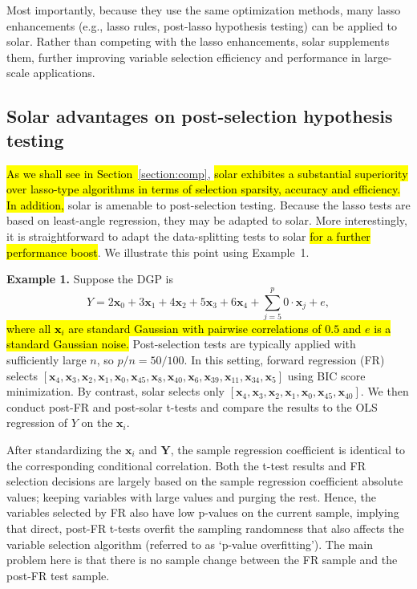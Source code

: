 \documentclass[11pt,review,authoryear]{elsarticle}
\begin{document}
Most importantly, because they use the same optimization methods, many lasso enhancements (e.g., lasso rules, post-lasso hypothesis testing) can be applied to solar. Rather than competing with the lasso enhancements, solar supplements them, further improving variable selection efficiency and performance in large-scale applications.

\subsection{Solar advantages on post-selection hypothesis testing}

\hl{As we shall see in Section~}\ref{section:comp}, \hl{solar exhibites a substantial superiority over lasso-type algorithms in terms of selection sparsity, accuracy and efficiency. In addition,} solar is amenable to post-selection testing. Because the lasso tests \citep{lockhartall14, taylor2014exact} are based on least-angle regression, they may be adapted to solar. More interestingly, it is straightforward to adapt the data-splitting tests \citep{wasserman2009high,meinshausen2009p} to solar \hl{for a further performance boost}. We illustrate this point using Example~1.

\smallskip
\noindent
\textbf{Example 1.} Suppose the DGP is
%
\begin{equation}
  Y = 2 \mathbf{x}_0 + 3 \mathbf{x}_1 + 4 \mathbf{x}_2 + 5 \mathbf{x}_3 + 6 \mathbf{x}_4 + \sum_{j=5}^{p} 0 \cdot \mathbf{x}_j + e, 
\end{equation}
%
\hl{where all $\mathbf{x}_i$ are standard Gaussian with pairwise correlations of $0.5$ and $e$ is a standard Gaussian noise.} Post-selection tests are typically applied with sufficiently large $n$, so $p/n=50/100$. In this setting, forward regression (FR) selects $\left[\mathbf{x}_4, \mathbf{x}_3, \mathbf{x}_2, \mathbf{x}_1, \mathbf{x}_0, \mathbf{x}_{45}, \mathbf{x}_{8}, \mathbf{x}_{40}, \mathbf{x}_{6}, \mathbf{x}_{39}, \mathbf{x}_{11}, \mathbf{x}_{34}, \mathbf{x}_{5} \right]$ using BIC score minimization. By contrast, solar selects only $\left[\mathbf{x}_4, \mathbf{x}_3, \mathbf{x}_2, \mathbf{x}_1, \mathbf{x}_0, \mathbf{x}_{45}, \mathbf{x}_{40} \right]$. We then conduct post-FR and post-solar t-tests and compare the results to the OLS regression of $Y$ on the $\mathbf{x}_i$.

After standardizing the $\mathbf{x}_i$ and $\mathbf{Y}$, the sample regression coefficient is identical to the corresponding conditional correlation. Both the t-test results and FR selection decisions are largely based on the sample regression coefficient absolute values; keeping variables with large values and purging the rest. Hence, the variables selected by FR also have low p-values on the current sample, implying that direct, post-FR t-tests overfit the sampling randomness that also affects the variable selection algorithm (referred to as `p-value overfitting'). The main problem here is that there is no sample change between the FR sample and the post-FR test sample.
\end{document}
